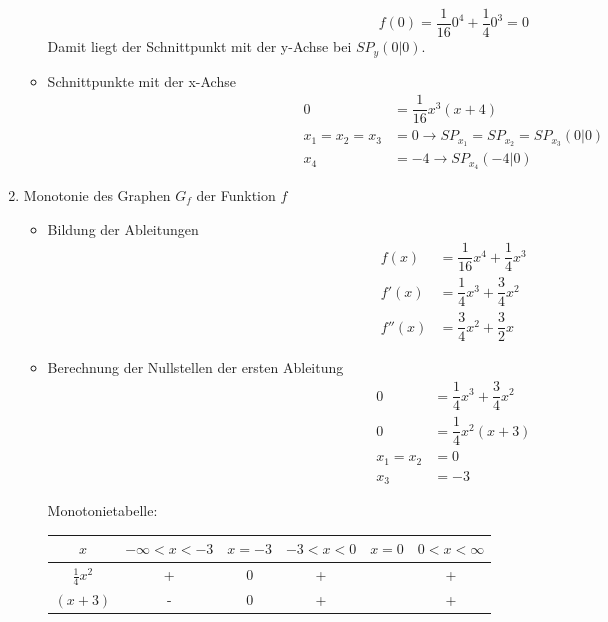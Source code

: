 \begin{bsp}{}{}
\begin{enumerate}
\begin{itemize}
    \begin{equation*}
        f(0) = \dfrac{1}{16}0^4 +\dfrac{1}{4}0^3 = 0
    \end{equation*}
    Damit liegt der Schnittpunkt mit der y-Achse bei $SP_y(0|0)$.
    \item Schnittpunkte mit der x-Achse
    \begin{equation*}
        \begin{split}
         0 &= \dfrac{1}{16} x^3 (x+4)\\
             x_1 =x_2=x_3&= 0 \longrightarrow SP_{x_1} = SP_{x_2} = SP_{x_3}(0|0) \\
             x_4&= -4 \longrightarrow SP_{x_4}(-4|0)
        \end{split}
\end{equation*}
    \end{itemize}
  \item Monotonie des Graphen $G_f$ der Funktion $f$  
    \begin{itemize}
        \item Bildung der Ableitungen
    \begin{equation*}
        \begin{split}
        f(x) &= \dfrac{1}{16} x^4 +\dfrac{1}{4} x^3\\
            f'(x)&= \dfrac{1}{4} x^3 +\dfrac{3}{4} x^2\\
            f''(x) &= \dfrac{3}{4} x^2 + \dfrac{3}{2} x
        \end{split}
\end{equation*}
       \item Berechnung der Nullstellen der ersten Ableitung 
           \begin{equation*}
        \begin{split}
         0 &= \dfrac{1}{4} x^3 +\dfrac{3}{4} x^2\\
         0 &= \dfrac{1}{4} x^2 (x+3)\\
         x_1 =x_2 &= 0\\
         x_3&= -3
        \end{split}
\end{equation*}

Monotonietabelle:
\begin{center}\begin{tabular}{||c|c|c|c|c|c||}
    \hline
    $x$& $ -\infty <x<-3 $ & $ x = -3$ &$ -3<x<0 $ & $x=0 $& $ 0<x<\infty $\\
    \hline \hline
    $\frac{1}{4} x^2$ & + &  0 & + &  & +  \\
    \hline
    $(x +3)$ & - & 0 & + &  & + \\
    \hline


\end{tabular}
\end{center}
\end{itemize}
\end{enumerate}
\end{bsp}
